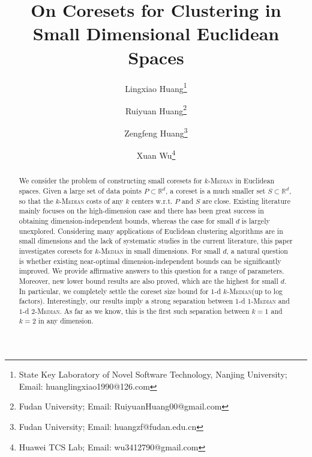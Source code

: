 \documentclass[11pt,letterpaper]{article}
\title{On Coresets for Clustering in Small Dimensional Euclidean Spaces}
\author{
    Lingxiao Huang\footnote{  State Key Laboratory of Novel Software Technology,
    Nanjing University; Email: huanglingxiao1990@126.com}
        \and
    Ruiyuan Huang\footnote{Fudan University; Email: RuiyuanHuang00@gmail.com}
        \and
    Zengfeng Huang\footnote{Fudan University; Email: huangzf@fudan.edu.cn}
        \and
    Xuan Wu\footnote{Huawei TCS Lab; Email: wu3412790@gmail.com}   
}
\date{}
\newcommand{\R}{\mathbb{R}}
\newcommand{\ProblemName}[1]{\textsc{#1}}
\newcommand{\kMedian}{\ProblemName{$k$-Median}\xspace}
\newcommand{\oneMedian}{\ProblemName{$1$-Median}\xspace}
\newcommand{\twoMedian}{\ProblemName{$2$-Median}\xspace}
\begin{document}
\maketitle

\begin{abstract}
We consider the problem of constructing small coresets for \kMedian in Euclidean spaces. Given a large set of data points $P\subset\R^d$, a coreset is a much smaller set $S\subset\R^d$, so that the \kMedian costs of any $k$ centers w.r.t. $P$ and $S$ are close. Existing literature mainly focuses on the high-dimension case and there has been great success in obtaining dimension-independent bounds, whereas the case for small $d$ is largely unexplored. Considering many applications of Euclidean clustering algorithms are in small dimensions and the lack of systematic studies in the current literature, this paper investigates coresets for \kMedian in small dimensions. For small $d$, a natural question is whether existing near-optimal dimension-independent bounds can be significantly improved. We provide affirmative answers to this question for a range of parameters. Moreover, new lower bound results are also proved, which are the highest for small $d$. In particular, we completely settle the coreset size bound for $1$-d \kMedian (up to log factors). Interestingly, our results imply a strong separation between $1$-d \oneMedian and $1$-d \twoMedian. As far as we know, this is the first such separation between $k=1$ and $k=2$ in any dimension.
\end{abstract}

\newpage

\tableofcontents


\newpage










	
\newpage
\appendix
\appendixpage
\addappheadtotoc

\end{document}
